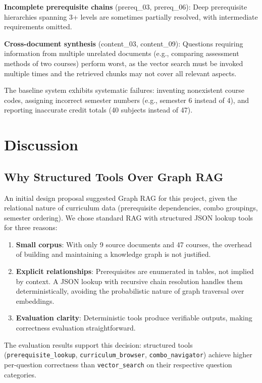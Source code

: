 \documentclass[lettersize,journal]{IEEEtran}
\begin{document}
\textbf{Incomplete prerequisite chains} (prereq\_03, prereq\_06): Deep prerequisite hierarchies spanning 3+ levels are sometimes partially resolved, with intermediate requirements omitted.

\textbf{Cross-document synthesis} (content\_03, content\_09): Questions requiring information from multiple unrelated documents (e.g., comparing assessment methods of two courses) perform worst, as the vector search must be invoked multiple times and the retrieved chunks may not cover all relevant aspects.

The baseline system exhibits systematic failures: inventing nonexistent course codes, assigning incorrect semester numbers (e.g., semester 6 instead of 4), and reporting inaccurate credit totals (40 subjects instead of 47).

\section{Discussion}

\subsection{Why Structured Tools Over Graph RAG}

An initial design proposal suggested Graph RAG for this project, given the relational nature of curriculum data (prerequisite dependencies, combo groupings, semester ordering). We chose standard RAG with structured JSON lookup tools for three reasons:

\begin{enumerate}
    \item \textbf{Small corpus}: With only 9 source documents and 47 courses, the overhead of building and maintaining a knowledge graph is not justified.
    \item \textbf{Explicit relationships}: Prerequisites are enumerated in tables, not implied by context. A JSON lookup with recursive chain resolution handles them deterministically, avoiding the probabilistic nature of graph traversal over embeddings.
    \item \textbf{Evaluation clarity}: Deterministic tools produce verifiable outputs, making correctness evaluation straightforward.
\end{enumerate}

The evaluation results support this decision: structured tools (\texttt{prerequisite\_lookup}, \texttt{curriculum\_browser}, \texttt{combo\_navigator}) achieve higher per-question correctness than \texttt{vector\_search} on their respective question categories.
\end{document}
